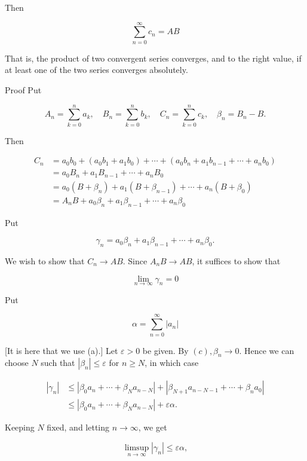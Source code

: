 \documentclass[10pt]{article}
\begin{document}
Then

$$
\sum_{n=0}^{\infty} c_{n}=A B
$$

That is, the product of two convergent series converges, and to the right value, if at least one of the two series converges absolutely.

Proof Put

$$
A_{n}=\sum_{k=0}^{n} a_{k}, \quad B_{n}=\sum_{k=0}^{n} b_{k}, \quad C_{n}=\sum_{k=0}^{n} c_{k}, \quad \beta_{n}=B_{n}-B .
$$

Then

$$
\begin{aligned}
C_{n} & =a_{0} b_{0}+\left(a_{0} b_{1}+a_{1} b_{0}\right)+\cdots+\left(a_{0} b_{n}+a_{1} b_{n-1}+\cdots+a_{n} b_{0}\right) \\
& =a_{0} B_{n}+a_{1} B_{n-1}+\cdots+a_{n} B_{0} \\
& =a_{0}\left(B+\beta_{n}\right)+a_{1}\left(B+\beta_{n-1}\right)+\cdots+a_{n}\left(B+\beta_{0}\right) \\
& =A_{n} B+a_{0} \beta_{n}+a_{1} \beta_{n-1}+\cdots+a_{n} \beta_{0}
\end{aligned}
$$

Put

$$
\gamma_{n}=a_{0} \beta_{n}+a_{1} \beta_{n-1}+\cdots+a_{n} \beta_{0} .
$$

We wish to show that $C_{n} \rightarrow A B$. Since $A_{n} B \rightarrow A B$, it suffices to show that

$$
\lim _{n \rightarrow \infty} \gamma_{n}=0
$$

Put

$$
\alpha=\sum_{n=0}^{\infty}\left|a_{n}\right|
$$

[It is here that we use (a).] Let $\varepsilon>0$ be given. By $(c), \beta_{n} \rightarrow 0$. Hence we can choose $N$ such that $\left|\beta_{n}\right| \leq \varepsilon$ for $n \geq N$, in which case

$$
\begin{aligned}
\left|\gamma_{n}\right| & \leq\left|\beta_{0} a_{n}+\cdots+\beta_{N} a_{n-N}\right|+\left|\beta_{N+1} a_{n-N-1}+\cdots+\beta_{n} a_{0}\right| \\
& \leq\left|\beta_{0} a_{n}+\cdots+\beta_{N} a_{n-N}\right|+\varepsilon \alpha .
\end{aligned}
$$

Keeping $N$ fixed, and letting $n \rightarrow \infty$, we get

$$
\limsup _{n \rightarrow \infty}\left|\gamma_{n}\right| \leq \varepsilon \alpha,
$$
\end{document}
